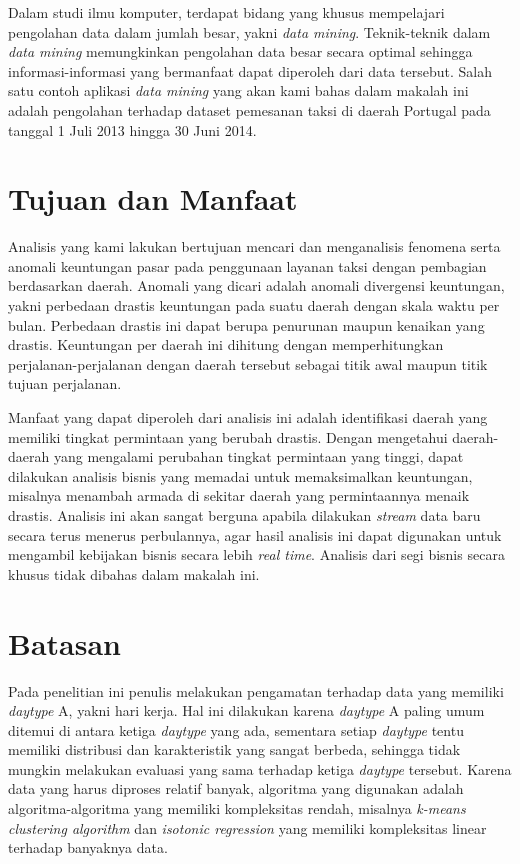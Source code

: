 \documentclass{article}
\begin{document}
Dalam studi ilmu komputer, terdapat bidang yang khusus mempelajari pengolahan data dalam jumlah besar, yakni \textit{data mining}. Teknik-teknik dalam \textit{data mining} memungkinkan pengolahan data besar secara optimal sehingga informasi-informasi yang bermanfaat dapat diperoleh dari data tersebut. Salah satu contoh aplikasi \textit{data mining} yang akan kami bahas dalam makalah ini adalah pengolahan terhadap dataset pemesanan taksi di daerah Portugal pada tanggal 1 Juli 2013 hingga 30 Juni 2014.


\section{Tujuan dan Manfaat}

Analisis yang kami lakukan bertujuan mencari dan menganalisis fenomena serta anomali keuntungan pasar pada penggunaan layanan taksi dengan pembagian berdasarkan daerah. Anomali yang dicari adalah anomali divergensi keuntungan, yakni perbedaan drastis keuntungan pada suatu daerah dengan skala waktu per bulan. Perbedaan drastis ini dapat berupa penurunan maupun kenaikan yang drastis. Keuntungan per daerah ini dihitung dengan memperhitungkan perjalanan-perjalanan dengan daerah tersebut sebagai titik awal maupun titik tujuan perjalanan.

Manfaat yang dapat diperoleh dari analisis ini adalah identifikasi daerah yang memiliki tingkat permintaan yang berubah drastis. Dengan mengetahui daerah-daerah yang mengalami perubahan tingkat permintaan yang tinggi, dapat dilakukan analisis bisnis yang memadai untuk memaksimalkan keuntungan, misalnya menambah armada di sekitar daerah yang permintaannya menaik drastis. Analisis ini akan sangat berguna apabila dilakukan \textit{stream} data baru secara terus menerus perbulannya, agar hasil analisis ini dapat digunakan untuk mengambil kebijakan bisnis secara lebih\textit{ real time}.  Analisis dari segi bisnis secara khusus tidak dibahas dalam makalah ini.

\section{Batasan}

Pada penelitian ini penulis melakukan pengamatan terhadap data yang memiliki \textit{daytype} A, yakni hari kerja. Hal ini dilakukan karena \textit{daytype} A paling umum ditemui di antara ketiga \textit{daytype} yang ada, sementara setiap \textit{daytype} tentu memiliki distribusi dan karakteristik yang sangat berbeda, sehingga tidak mungkin melakukan evaluasi yang sama terhadap ketiga \textit{daytype} tersebut. Karena data yang harus diproses relatif banyak, algoritma yang digunakan adalah algoritma-algoritma yang memiliki kompleksitas rendah, misalnya \textit{k-means clustering algorithm} dan  \textit{isotonic regression} yang memiliki kompleksitas linear terhadap banyaknya data.
\end{document}
